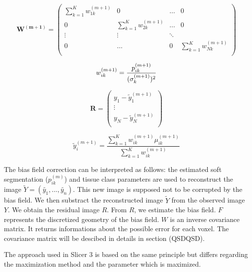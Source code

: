 \begin{itemize}
\begin{itemize}
  \begin{equation*}
   \mathbf{W^{(m+1)}} = \left(
  \begin{array}{clcr}
   \sum_{k=1}^K w_{1k}^{(m+1)} & 0 & \ldots & 0 \\
   0 & \sum_{k=1}^K w_{2k}^{(m+1)} & \ldots & 0 \\
   \vdots & \vdots & \ddots \\
   0 &  \ldots & 0 & \sum_{k=1}^K w_{Nk}^{(m+1)} \\
  \end{array} \right)
  \end{equation*}

  \begin{equation*}
  w_{ik}^{(m+1)}  = \frac{p_{ik}^{(m+1)}}{(\sigma_k^{(m+1)})^2}\\
  \end{equation*}
  
  \begin{equation*}
   \mathbf{R} = \left(
  \begin{array}{cl}
   y_1 - \tilde{y}_1^{(m+1)} \\
   \vdots\\
   y_N - \tilde{y}_N^{(m+1)} \\
  \end{array} \right)
  \end{equation*}
  
  \begin{equation*}
  \tilde{y}_i^{(m+1)}  = \frac{\sum_{k=1}^K w_{ik}^{(m+1)} \mu_{ik}^{(m+1)}}{\sum_{k=1}^K w_{ik}^{(m+1)}}
  \end{equation*}


  \end{itemize}

\end{itemize}

The bias field correction can be interpreted as follows: the estimated soft segmentation ($p_{ik}^{(m)}$) and tissue class parameters are used to reconstruct the image $\tilde{Y}=(\tilde{y_1}, ..., \tilde{y_n})$. This new image is supposed not to be corrupted by the bias field. We then substract the reconstructed image $\tilde{Y}$ from the observed image $Y$. We obtain the residual image $R$. From $R$, we estimate the bias field. $F$ represents the discretized geometry of the bias field. $W$ is an inverse covariance matrix. It returns informations about the possible error for each voxel. The covariance matrix will be descibed in details in section (QSDQSD).
\par
The approach used in Slicer 3 is based on the same principle but differs regarding the maximization method and the parameter which is maximized.
%
